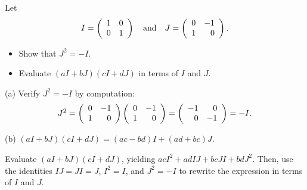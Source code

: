 \documentclass{ximera}
\begin{document}
\begin{exercise} \label{c4.7.5}
Let
\[
I = \left(\begin{array}{rr} 1 & 0\\ 0 &1\end{array}\right) \quad\mbox{and}\quad J =\left(\begin{array}{rr} 0 & -1\\ 1 &0\end{array}\right).
\]
\begin{itemize}
\item[(a)] Show that $J^2=-I$.
\item[(b)] Evaluate $(aI+bJ)(cI+dJ)$ in terms of $I$ and $J$.
\end{itemize}

\begin{solution}

(a) Verify $J^2 = -I$ by computation:
\[ J^2 = \left(\begin{array}{rr} 0 & -1\\ 1 &0\end{array}\right)\left(\begin{array}{rr} 0 & -1\\ 1 &0\end{array}\right) =
\left(\begin{array}{rr} -1 & 0\\ 0 &-1\end{array}\right) = -I. \]

(b) \ans $(aI + bJ)(cI + dJ) = (ac - bd)I + (ad + bc)J$.

\soln Evaluate $(aI + bJ)(cI + dJ)$, yielding
$acI^2 + adIJ + bcJI + bdJ^2$.  Then, use the identities $IJ = JI = J$,
$I^2 = I$, and $J^2 = -I$ to rewrite the expression in terms of $I$
and $J$.

\end{solution}
\end{exercise}
\end{document}
